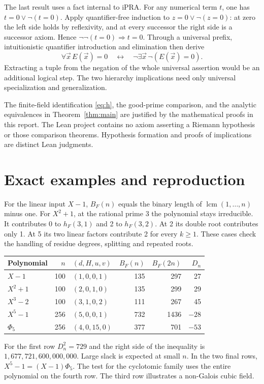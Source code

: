 \documentclass[11pt]{article}
\begin{document}
The last result uses a fact internal to iPRA. For any numerical term \(t\), one has \(t=0\lor\neg(t=0)\). Apply quantifier-free induction to \(z=0\lor\neg(z=0)\): at zero the left side holds by reflexivity, and at every successor the right side is a successor axiom. Hence \(\neg\neg(t=0)\Rightarrow t=0\). Through a universal prefix, intuitionistic quantifier introduction and elimination then derive
\[
  \forall\vec x\,E(\vec x)=0\quad\longleftrightarrow\quad
        \neg\exists\vec x\,\neg(E(\vec x)=0).
\]
Extracting a tuple from the negation of the whole universal assertion would be an additional logical step. The two hierarchy implications need only universal specialization and generalization.

The finite-field identification \eqref{eq:h}, the good-prime comparison, and the analytic equivalences in Theorem~\ref{thm:main} are justified by the mathematical proofs in this report. The Lean project contains no axiom asserting a Riemann hypothesis or those comparison theorems. Hypothesis formation and proofs of implications are distinct Lean judgments.
\newpage
\section{Exact examples and reproduction}
For the linear input \(X-1\), \(B_F(n)\) equals the binary length of \(\operatorname{lcm}(1,\ldots,n)\) minus one. For \(X^2+1\), at the rational prime 3 the polynomial stays irreducible. It contributes 0 to \(h_F(3,1)\) and 2 to \(h_F(3,2)\). At 2 its double root contributes only 1. At 5 its two linear factors contribute 2 for every \(k\ge1\). These cases check the handling of residue degrees, splitting and repeated roots.
\begin{center}\small
\begin{tabular}{@{}lrlrrr@{}}\toprule
Polynomial & \(n\) & \((d,H,u,v)\) & \(B_F(n)\) & \(B_F(2n)\) & \(D_n\)\\\midrule
\(X-1\) &100&\((1,0,0,1)\)&135&297&27\\
\(X^2+1\) &100&\((2,0,1,0)\)&135&299&29\\
\(X^3-2\) &100&\((3,1,0,2)\)&111&267&45\\
\(X^5-1\) &256&\((5,0,0,1)\)&732&1436&\(-28\)\\
\(\Phi_5\) &256&\((4,0,15,0)\)&377&701&\(-53\)\\\bottomrule
\end{tabular}
\end{center}
For the first row \(D_n^2=729\) and the right side of the inequality is \(1{,}677{,}721{,}600{,}000{,}000\). Large slack is expected at small \(n\). In the two final rows, \(X^5-1=(X-1)\Phi_5\). The test for the cyclotomic family uses the entire polynomial on the fourth row. The third row illustrates a non-Galois cubic field.
\end{document}
